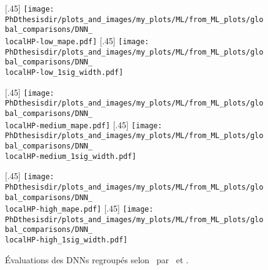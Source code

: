 \begin{figure}[p]
\centering

\subcaptionbox{\label{subfig-\localHP-low_mape}}[.45\textwidth]
{\texttt{[image: \\PhDthesisdir/plots\_and\_images/my\_plots/ML/from\_ML\_plots/global\_comparisons/DNN\_\\localHP-low\_mape.pdf]}\vspace{-\baselineskip}}
\hfill
\subcaptionbox{\label{subfig-\localHP-low_1sigma}}[.45\textwidth]
{\texttt{[image: \\PhDthesisdir/plots\_and\_images/my\_plots/ML/from\_ML\_plots/global\_comparisons/DNN\_\\localHP-low\_1sig\_width.pdf]}\vspace{-\baselineskip}}

\subcaptionbox{\label{subfig-\localHP-medium_mape}}[.45\textwidth]
{\texttt{[image: \\PhDthesisdir/plots\_and\_images/my\_plots/ML/from\_ML\_plots/global\_comparisons/DNN\_\\localHP-medium\_mape.pdf]}\vspace{-\baselineskip}}
\hfill
\subcaptionbox{\label{subfig-\localHP-medium_1sigma}}[.45\textwidth]
{\texttt{[image: \\PhDthesisdir/plots\_and\_images/my\_plots/ML/from\_ML\_plots/global\_comparisons/DNN\_\\localHP-medium\_1sig\_width.pdf]}\vspace{-\baselineskip}}

\subcaptionbox{\label{subfig-\localHP-high_mape}}[.45\textwidth]
{\texttt{[image: \\PhDthesisdir/plots\_and\_images/my\_plots/ML/from\_ML\_plots/global\_comparisons/DNN\_\\localHP-high\_mape.pdf]}\vspace{-\baselineskip}}
\hfill
\subcaptionbox{\label{subfig-\localHP-high_1sigma}}[.45\textwidth]
{\texttt{[image: \\PhDthesisdir/plots\_and\_images/my\_plots/ML/from\_ML\_plots/global\_comparisons/DNN\_\\localHP-high\_1sig\_width.pdf]}\vspace{-\baselineskip}}

\caption[Évaluations des DNNs regroupés selon \localHPlong.]{Évaluations des DNNs regroupés selon \localHPlong\ par \LossMAPE\ et \OneSigmaWidth.}
\label{fig-\localHP}
\end{figure}
